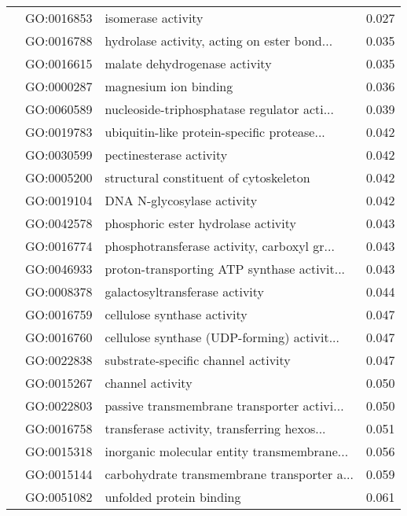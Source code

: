 \begin{longtable}{lllr}
   & GO:0016853 &                           isomerase activity &         0.027 \\
   & GO:0016788 &  hydrolase activity, acting on ester bond... &         0.035 \\
   & GO:0016615 &                malate dehydrogenase activity &         0.035 \\
   & GO:0000287 &                        magnesium ion binding &         0.036 \\
   & GO:0060589 &  nucleoside-triphosphatase regulator acti... &         0.039 \\
   & GO:0019783 &  ubiquitin-like protein-specific protease... &         0.042 \\
   & GO:0030599 &                      pectinesterase activity &         0.042 \\
   & GO:0005200 &       structural constituent of cytoskeleton &         0.042 \\
   & GO:0019104 &                   DNA N-glycosylase activity &         0.042 \\
   & GO:0042578 &          phosphoric ester hydrolase activity &         0.043 \\
   & GO:0016774 &  phosphotransferase activity, carboxyl gr... &         0.043 \\
   & GO:0046933 &  proton-transporting ATP synthase activit... &         0.043 \\
   & GO:0008378 &               galactosyltransferase activity &         0.044 \\
   & GO:0016759 &                  cellulose synthase activity &         0.047 \\
   & GO:0016760 &  cellulose synthase (UDP-forming) activit... &         0.047 \\
   & GO:0022838 &          substrate-specific channel activity &         0.047 \\
   & GO:0015267 &                             channel activity &         0.050 \\
   & GO:0022803 &  passive transmembrane transporter activi... &         0.050 \\
   & GO:0016758 &  transferase activity, transferring hexos... &         0.051 \\
   & GO:0015318 &  inorganic molecular entity transmembrane... &         0.056 \\
   & GO:0015144 &  carbohydrate transmembrane transporter a... &         0.059 \\
   & GO:0051082 &                     unfolded protein binding &         0.061 \\

\end{longtable}
